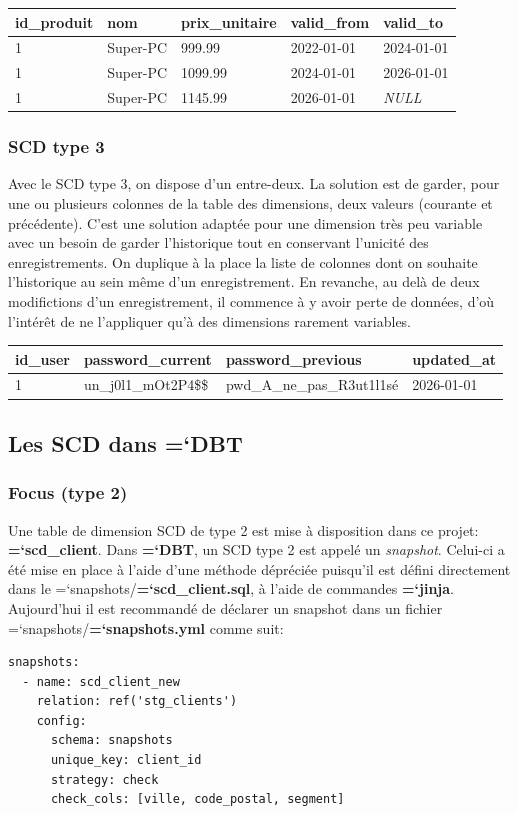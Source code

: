 \documentclass[11pt]{article}
\renewcommand{\emph}[1]{\textsl{#1}}
\newcommand{\techno}[1]{{\ttfamily\bfseries\hyphenchar\font=`\-\color{Sienna}#1}}
\newcommand{\fichier}[1]{\colorbox{backcolor}{\ttfamily\bfseries\hyphenchar\font=`\-\color{filecolor}#1}}
\newcommand{\datatable}[1]{\tcbox{\ttfamily\hyphenchar\font=`\-\color{tablecolor}#1}}
\newcommand{\folder}[1]{\colorbox{backcolor}{\ttfamily\hyphenchar\font=`\-\color{FireBrick}#1}}
\newcommand{\dbt}{\techno{DBT}}
\newcommand{\jinja}{\techno{jinja}}
\begin{document}
\noindent \begin{tabularx}{\linewidth}{|l|l|L|l|l|}
    \hline
    id\_produit & nom      & prix\_unitaire & valid\_from & valid\_to   \\
               & Super-PC & 999.99         & 2022-01-01  & 2024-01-01  \\
    1           & Super-PC & 1099.99        & 2024-01-01  & 2026-01-01  \\
    1           & Super-PC & 1145.99        & 2026-01-01  & \emph{NULL} \\
    \hline
\end{tabularx}

\subsubsection*{SCD type 3}

Avec le SCD type 3, on dispose d'un entre-deux. La solution est de garder, pour une ou plusieurs colonnes de la table des dimensions, deux valeurs (courante et précédente). C'est une solution adaptée pour une dimension très peu variable avec un besoin de garder l'historique tout en conservant l'unicité des enregistrements. On duplique à la place la liste de colonnes dont on souhaite l'historique au sein même d'un enregistrement. En revanche, au delà de deux modifictions d'un enregistrement, il commence à y avoir perte de données, d'où l'intérêt de ne l'appliquer qu'à des dimensions rarement variables.

\noindent \begin{tabularx}{\linewidth}{|l|L|L|l|}
    \hline
    id\_user & password\_current    & password\_previous         & updated\_at \\
            & un\_j0l1\_mOt2P4\$\$ & pwd\_A\_ne\_pas\_R3ut1l1sé & 2026-01-01  \\
    \hline
\end{tabularx}

\subsection{Les SCD dans \dbt}
\subsubsection*{Focus \datatable{scd\_client} (type 2)}

Une table de dimension SCD de type 2 est mise à disposition dans ce projet: \fichier{scd\_client}. Dans \dbt, un SCD type 2 est appelé un \emph{snapshot}. Celui-ci a été mise en place à l'aide d'une méthode dépréciée puisqu'il est défini directement dans le \folder{snapshots/}\fichier{scd\_client.sql}, à l'aide de commandes \jinja. Aujourd'hui il est recommandé de déclarer un snapshot dans un fichier \folder{snapshots/}\fichier{snapshots.yml} comme suit:
\begin{lstlisting}[]
snapshots:
  - name: scd_client_new
    relation: ref('stg_clients')
    config:
      schema: snapshots
      unique_key: client_id
      strategy: check
      check_cols: [ville, code_postal, segment]
\end{lstlisting}
\end{document}
